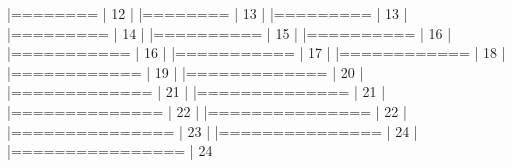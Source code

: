 \documentclass[10pt]{article}
\newenvironment{CodeChunk}{}{}
\begin{document}
\begin{CodeChunk}
\begin{CodeChunk}
\begin{CodeOutput}
  |========                                                         |  12%
  |                                                                       
  |========                                                         |  13%
  |                                                                       
  |=========                                                        |  13%
  |                                                                       
  |=========                                                        |  14%
  |                                                                       
  |==========                                                       |  15%
  |                                                                       
  |==========                                                       |  16%
  |                                                                       
  |===========                                                      |  16%
  |                                                                       
  |===========                                                      |  17%
  |                                                                       
  |============                                                     |  18%
  |                                                                       
  |============                                                     |  19%
  |                                                                       
  |=============                                                    |  20%
  |                                                                       
  |=============                                                    |  21%
  |                                                                       
  |==============                                                   |  21%
  |                                                                       
  |==============                                                   |  22%
  |                                                                       
  |===============                                                  |  22%
  |                                                                       
  |===============                                                  |  23%
  |                                                                       
  |===============                                                  |  24%
  |                                                                       
  |================                                                 |  24%

\end{CodeOutput}
\end{CodeChunk}
\end{CodeChunk}
\end{document}
